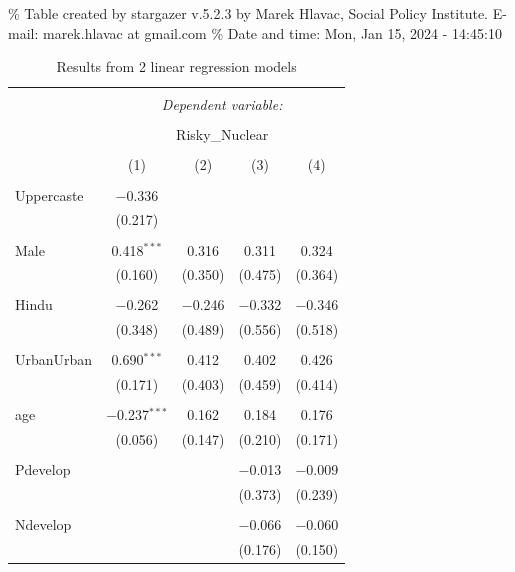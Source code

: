\documentclass[
]{article}
\begin{document}
\begingroup\setlength{\tabcolsep}{1pt}

\renewcommand{\arraystretch}{0.7}

\% Table created by stargazer v.5.2.3 by Marek Hlavac, Social Policy
Institute. E-mail: marek.hlavac at gmail.com \% Date and time: Mon, Jan
15, 2024 - 14:45:10

\begin{table}[!htbp] \centering 
  \caption{Results from 2 linear regression models} 
  \label{} 
\begin{tabular}{@{\extracolsep{5pt}}lcccc} 
\\[-1.8ex]\hline 
\hline \\[-1.8ex] 
 & \multicolumn{4}{c}{\textit{Dependent variable:}} \\ 
\cline{2-5} 
\\[-1.8ex] & \multicolumn{4}{c}{Risky\_Nuclear} \\ 
\\[-1.8ex] & (1) & (2) & (3) & (4)\\ 
\hline \\[-1.8ex] 
 Uppercaste & $-$0.336 &  &  &  \\ 
  & (0.217) &  &  &  \\ 
  & & & & \\ 
 Male & 0.418$^{***}$ & 0.316 & 0.311 & 0.324 \\ 
  & (0.160) & (0.350) & (0.475) & (0.364) \\ 
  & & & & \\ 
 Hindu & $-$0.262 & $-$0.246 & $-$0.332 & $-$0.346 \\ 
  & (0.348) & (0.489) & (0.556) & (0.518) \\ 
  & & & & \\ 
 UrbanUrban & 0.690$^{***}$ & 0.412 & 0.402 & 0.426 \\ 
  & (0.171) & (0.403) & (0.459) & (0.414) \\ 
  & & & & \\ 
 age & $-$0.237$^{***}$ & 0.162 & 0.184 & 0.176 \\ 
  & (0.056) & (0.147) & (0.210) & (0.171) \\ 
  & & & & \\ 
 Pdevelop &  &  & $-$0.013 & $-$0.009 \\ 
  &  &  & (0.373) & (0.239) \\ 
  & & & & \\ 
 Ndevelop &  &  & $-$0.066 & $-$0.060 \\ 
  &  &  & (0.176) & (0.150) \\ 

\end{tabular}
\end{table}
\end{document}
